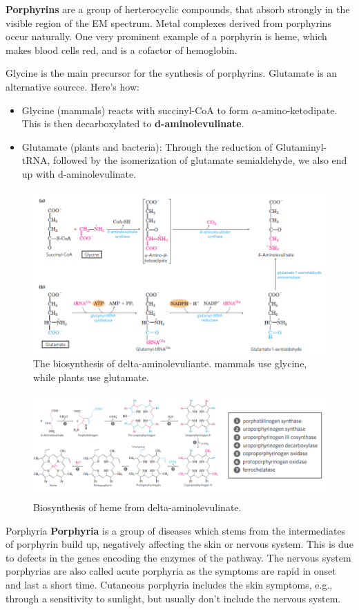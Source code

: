 \documentclass[../main.tex]{subfiles}
\begin{document}
\textbf{\gls{Porphyrins}} are a group of herterocyclic compounds, that absorb strongly in the visible region of the EM spectrum. Metal complexes derived from porphyrins occur naturally. One very prominent example of a porphyrin is heme, which makes blood cells red, and is a cofactor of hemoglobin.

Glycine is the main precursor for the synthesis of porphyrins. Glutamate is an alternative sourcce. Here's how:
\begin{itemize}
	\item Glycine (mammals) reacts with succinyl-CoA to form $\alpha$-amino-ketodipate. This is then decarboxylated to \textbf{\gls{d-aminolevulinate}}.
	\item Glutamate (plants and bacteria): Through the reduction of Glutaminyl-tRNA, followed by the isomerization of glutamate semialdehyde, we also end up with d-aminolevulinate.
\end{itemize}

\begin{figure}[H]
	\centering
	\includegraphics[width=0.5\linewidth]{por_glyglu}
	\caption{The biosynthesis of delta-aminolevuliante. mammals use glycine, while plants use glutamate.}
	\label{fig:porglyglu}
\end{figure}

\begin{figure}[H]
	\centering
	\includegraphics[width=0.7\linewidth]{por_synth}
	\caption{Biosynthesis of heme from delta-aminolevulinate.}
	\label{fig:porsynth}
\end{figure}

\begin{RemarkWithTitel}{Porphyria}
	 \textbf{\gls{Porphyria}} is a group of diseases which stems from the intermediates of porphyrin build up, negatively affecting the skin or nervous system. This is due to defects in the genes encoding the enzymes of the pathway. The nervous system porphyrias are also called acute porphyria as the symptoms are rapid in onset and last a short time. Cutaneous porphyria includes the skin symptoms, e.g., through a sensitivity to sunlight, but usually don't include the nervous system.
\end{RemarkWithTitel}
\end{document}

